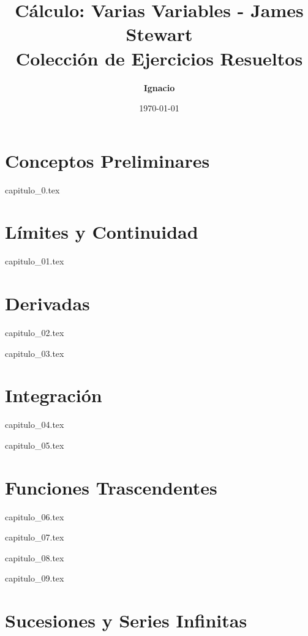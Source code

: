 \documentclass[11pt,spanish,oneside]{book}
\title{\textbf{Cálculo: Varias Variables - James Stewart} \\ \Large Colección de Ejercicios Resueltos}
\author{\textbf{Ignacio}}
\date{\today}
\begin{document}
\maketitle

\tableofcontents

\part{Conceptos Preliminares}

{capitulo_0.tex}

\part{Límites y Continuidad}

{capitulo_01.tex}

\part{Derivadas}

{capitulo_02.tex}

{capitulo_03.tex}

\part{Integración}

{capitulo_04.tex}

{capitulo_05.tex}

\part{Funciones Trascendentes}

{capitulo_06.tex}

{capitulo_07.tex}

{capitulo_08.tex}

{capitulo_09.tex}

\part{Sucesiones y Series Infinitas}
\end{document}
